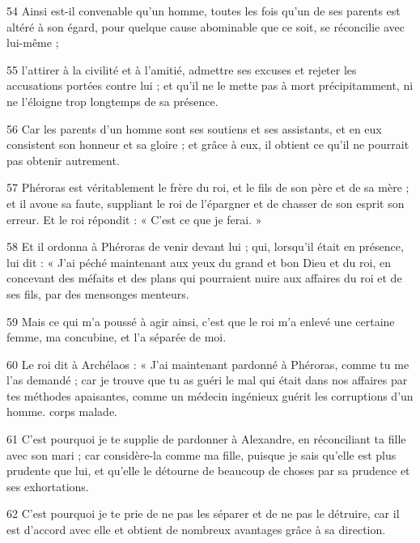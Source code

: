 \par 54 Ainsi est-il convenable qu'un homme, toutes les fois qu'un de ses parents est altéré à son égard, pour quelque cause abominable que ce soit, se réconcilie avec lui-même ;

\par 55 l'attirer à la civilité et à l'amitié, admettre ses excuses et rejeter les accusations portées contre lui ; et qu'il ne le mette pas à mort précipitamment, ni ne l'éloigne trop longtemps de sa présence.

\par 56 Car les parents d'un homme sont ses soutiens et ses assistants, et en eux consistent son honneur et sa gloire ; et grâce à eux, il obtient ce qu'il ne pourrait pas obtenir autrement.

\par 57 Phéroras est véritablement le frère du roi, et le fils de son père et de sa mère ; et il avoue sa faute, suppliant le roi de l'épargner et de chasser de son esprit son erreur. Et le roi répondit : « C'est ce que je ferai. »

\par 58 Et il ordonna à Phéroras de venir devant lui ; qui, lorsqu'il était en présence, lui dit : « J'ai péché maintenant aux yeux du grand et bon Dieu et du roi, en concevant des méfaits et des plans qui pourraient nuire aux affaires du roi et de ses fils, par des mensonges menteurs.

\par 59 Mais ce qui m'a poussé à agir ainsi, c'est que le roi m'a enlevé une certaine femme, ma concubine, et l'a séparée de moi.

\par 60 Le roi dit à Archélaos : « J'ai maintenant pardonné à Phéroras, comme tu me l'as demandé ; car je trouve que tu as guéri le mal qui était dans nos affaires par tes méthodes apaisantes, comme un médecin ingénieux guérit les corruptions d'un homme. corps malade.

\par 61 C'est pourquoi je te supplie de pardonner à Alexandre, en réconciliant ta fille avec son mari ; car considère-la comme ma fille, puisque je sais qu'elle est plus prudente que lui, et qu'elle le détourne de beaucoup de choses par sa prudence et ses exhortations.

\par 62 C'est pourquoi je te prie de ne pas les séparer et de ne pas le détruire, car il est d'accord avec elle et obtient de nombreux avantages grâce à sa direction.

